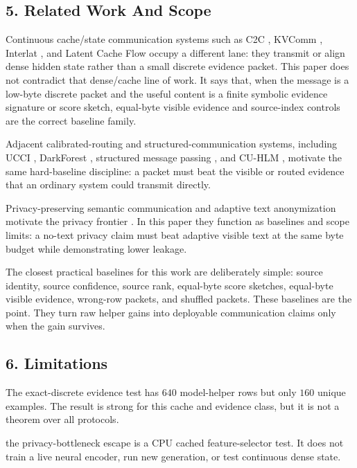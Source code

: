 \documentclass{article}
\begin{document}
\hypertarget{related-work-and-scope}{%
\subsection{5. Related Work And Scope}\label{related-work-and-scope}}

Continuous cache/state communication systems such as C2C
\citep{c2c2026}, KVComm \citep{kvcomm2026}, Interlat
\citep{interlat2026}, and Latent Cache Flow \citep{lcf2026} occupy a
different lane: they transmit or align dense hidden state rather than a
small discrete evidence packet. This paper does not contradict that
dense/cache line of work. It says that, when the message is a low-byte
discrete packet and the useful content is a finite symbolic evidence
signature or score sketch, equal-byte visible evidence and source-index
controls are the correct baseline family.

Adjacent calibrated-routing and structured-communication systems,
including UCCI \citep{ucci2026}, DarkForest \citep{darkforest2026},
structured message passing \citep{smp2013}, and CU-HLM
\citep{cu_hlm2026}, motivate the same hard-baseline discipline: a packet
must beat the visible or routed evidence that an ordinary system could
transmit directly.

Privacy-preserving semantic communication and adaptive text
anonymization motivate the privacy frontier
\citep{ibal2023, adaptive_anonymization2026}. In this paper they
function as baselines and scope limits: a no-text privacy claim must
beat adaptive visible text at the same byte budget while demonstrating
lower leakage.

The closest practical baselines for this work are deliberately simple:
source identity, source confidence, source rank, equal-byte score
sketches, equal-byte visible evidence, wrong-row packets, and shuffled
packets. These baselines are the point. They turn raw helper gains into
deployable communication claims only when the gain survives.

\hypertarget{limitations}{%
\subsection{6. Limitations}\label{limitations}}

The exact-discrete evidence test has \(640\) model-helper rows but
only \(160\) unique examples. The result is strong for this cache
and evidence class, but it is not a theorem over all protocols.

the privacy-bottleneck escape is a CPU cached feature-selector test. It
does not train a live neural encoder, run new generation, or test
continuous dense state.
\end{document}

